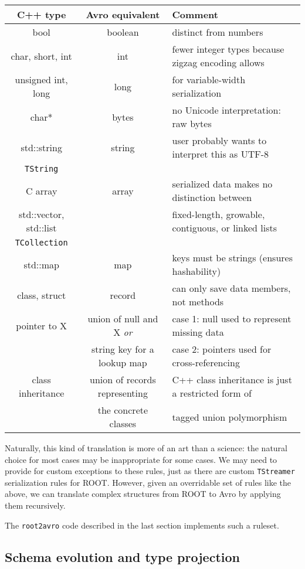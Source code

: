 \documentclass{article}
\begin{document}
\noindent\begin{center}
\begin{tabular}{c c l}
C++ type & Avro equivalent & Comment \\\hline\hline
bool & boolean & distinct from numbers \\\hline
char, short, int & int  & fewer integer types because zigzag encoding allows \\
unsigned int, long & long & for variable-width serialization \\\hline
char* & bytes & no Unicode interpretation: raw bytes \\\hline
std::string & string & user probably wants to interpret this as UTF-8 \\
{\tt TString} & & \\\hline
C array & array & serialized data makes no distinction between \\
std::vector, std::list & & fixed-length, growable, contiguous, or linked lists \\
{\tt TCollection} & & \\\hline
std::map & map & keys must be strings (ensures hashability) \\\hline
class, struct & record & can only save data members, not methods \\\hline
pointer to X & union of null and X {\it or} & case 1: null used to represent missing data \\
& string key for a lookup map & case 2: pointers used for cross-referencing \\\hline
class inheritance & union of records representing & C++ class inheritance is just a restricted form of \\
& the concrete classes & tagged union polymorphism \\
\end{tabular}
\end{center}

Naturally, this kind of translation is more of an art than a science: the natural choice for most cases may be inappropriate for some cases. We may need to provide for custom exceptions to these rules, just as there are custom {\tt TStreamer} serialization rules for ROOT. However, given an overridable set of rules like the above, we can translate complex structures from ROOT to Avro by applying them recursively.

The {\tt root2avro} code described in the last section implements such a ruleset.

\subsection*{Schema evolution and type projection}
\end{document}
